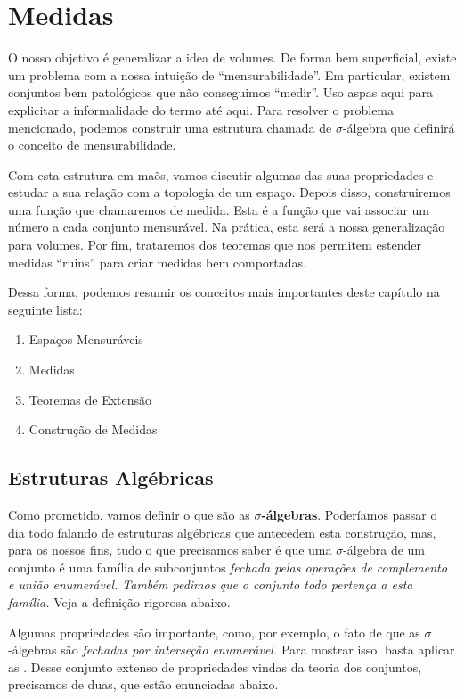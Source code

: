 \chapter{Medidas}

O nosso objetivo é generalizar a idea de volumes. De forma bem superficial, existe um problema com a nossa intuição de ``mensurabilidade''. Em particular, existem conjuntos bem patológicos que não conseguimos ``medir''. Uso aspas aqui para explicitar a informalidade do termo até aqui. Para resolver o problema mencionado, podemos construir uma estrutura chamada de \texorpdfstring{$\sigma$}{sigma}-álgebra que definirá o conceito de mensurabilidade.

Com esta estrutura em maõs, vamos discutir algumas das suas propriedades e estudar a sua relação com a topologia de um espaço. Depois disso, construiremos uma função que chamaremos de medida. Esta é a função que vai associar um número a cada conjunto mensurável. Na prática, esta será a nossa generalização para volumes. Por fim, trataremos dos teoremas que nos permitem estender medidas ``ruins'' para criar medidas bem comportadas.

Dessa forma, podemos resumir os conceitos mais importantes deste capítulo na seguinte lista:

\begin{enumerate}
    \item Espaços Mensuráveis
    \item Medidas
    \item Teoremas de Extensão
    \item Construção de Medidas
\end{enumerate}

\section{Estruturas Algébricas}
Como prometido, vamos definir o que são as \textbf{\texorpdfstring{$\sigma$}{sigma}-álgebras}. Poderíamos passar o dia todo falando de estruturas algébricas que antecedem esta construção, mas, para os nossos fins, tudo o que precisamos saber é que uma \texorpdfstring{$\sigma$}{sigma}-álgebra de um conjunto é uma família de subconjuntos \textit{fechada pelas operações de complemento e união enumerável. Também pedimos que o conjunto todo pertença a esta família.} Veja a definição rigorosa abaixo.

\sigmaAlgebra

Algumas propriedades são importante, como, por exemplo, o fato de que as \texorpdfstring{$\sigma$}{sigma}-álgebras são \textit{fechadas por interseção enumerável.} Para mostrar isso, basta aplicar as . Desse conjunto extenso de propriedades vindas da teoria dos conjuntos, precisamos de duas, que estão enunciadas abaixo.

